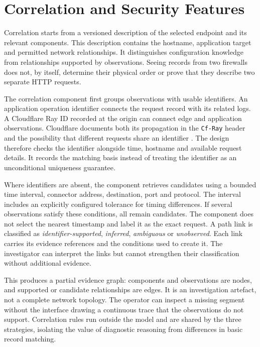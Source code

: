 \section{Correlation and Security Features}
\label{sec:design:correlation}

Correlation starts from a versioned description of the selected endpoint
and its relevant components. This description contains the hostname,
application target and permitted network relationships. It distinguishes
configuration knowledge from relationships supported by observations.
Seeing records from two firewalls does not, by itself, determine their
physical order or prove that they describe two separate HTTP requests.

The correlation component first groups observations with usable
identifiers. An application operation identifier connects the request
record with its related logs. A Cloudflare Ray ID recorded at the origin
can connect edge and application observations. Cloudflare documents both
its propagation in the \texttt{Cf-Ray} header and the possibility that
different requests share an identifier
\parencite{cloudflare2026rayid}. The design therefore checks the identifier
alongside time, hostname and available request details. It records the
matching basis instead of treating the identifier as an unconditional
uniqueness guarantee.

Where identifiers are absent, the component retrieves candidates using a
bounded time interval, connector address, destination, port and protocol.
The interval includes an explicitly configured tolerance for timing
differences. If several observations satisfy these conditions, all remain
candidates. The component does not select the nearest timestamp and label
it as the exact request. A path link is classified as
\emph{identifier-supported}, \emph{inferred}, \emph{ambiguous} or
\emph{unobserved}. Each link carries its evidence references and the
conditions used to create it. The investigator can interpret the links
but cannot strengthen their classification without additional evidence.

This produces a partial evidence graph: components and observations are
nodes, and supported or candidate relationships are edges. It is an
investigation artefact, not a complete network topology. The operator can
inspect a missing segment without the interface drawing a continuous
trace that the observations do not support. Correlation rules run outside
the model and are shared by the three strategies, isolating the value of
diagnostic reasoning from differences in basic record matching.

